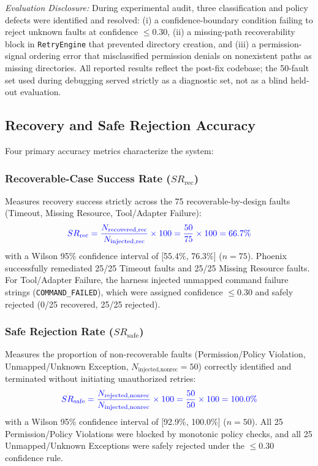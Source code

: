 \documentclass[conference]{IEEEtran}
\newcommand{\chg}[1]{{\color{blue}#1}}
\begin{document}
\chg{\textit{Evaluation Disclosure:} During experimental audit, three classification and policy defects were identified and resolved: (i) a confidence-boundary condition failing to reject unknown faults at confidence $\le 0.30$, (ii) a missing-path recoverability block in \texttt{RetryEngine} that prevented directory creation, and (iii) a permission-signal ordering error that misclassified permission denials on nonexistent paths as missing directories. All reported results reflect the post-fix codebase; the 50-fault set used during debugging served strictly as a diagnostic set, not as a blind held-out evaluation.}

\subsection{\chg{Recovery and Safe Rejection Accuracy}}
\chg{Four primary accuracy metrics characterize the system:}

\subsubsection{\chg{Recoverable-Case Success Rate ($SR_{\text{rec}}$)}}
\chg{Measures recovery success strictly across the 75 recoverable-by-design faults (Timeout, Missing Resource, Tool/Adapter Failure):}
\begin{equation}
\chg{SR_{\text{rec}} = \frac{N_{\text{recovered,rec}}}{N_{\text{injected,rec}}} \times 100 = \frac{50}{75} \times 100 = 66.7\%}
\end{equation}
\chg{with a Wilson 95\% confidence interval of [55.4\%, 76.3\%] ($n=75$). Phoenix successfully remediated 25/25 Timeout faults and 25/25 Missing Resource faults. For Tool/Adapter Failure, the harness injected unmapped command failure strings (\texttt{COMMAND\_FAILED}), which were assigned confidence $\le 0.30$ and safely rejected (0/25 recovered, 25/25 rejected).}

\subsubsection{\chg{Safe Rejection Rate ($SR_{\text{safe}}$)}}
\chg{Measures the proportion of non-recoverable faults (Permission/Policy Violation, Unmapped/Unknown Exception, $N_{\text{injected,nonrec}} = 50$) correctly identified and terminated without initiating unauthorized retries:}
\begin{equation}
\chg{SR_{\text{safe}} = \frac{N_{\text{rejected,nonrec}}}{N_{\text{injected,nonrec}}} \times 100 = \frac{50}{50} \times 100 = 100.0\%}
\end{equation}
\chg{with a Wilson 95\% confidence interval of [92.9\%, 100.0\%] ($n=50$). All 25 Permission/Policy Violations were blocked by monotonic policy checks, and all 25 Unmapped/Unknown Exceptions were safely rejected under the $\le 0.30$ confidence rule.}
\end{document}
